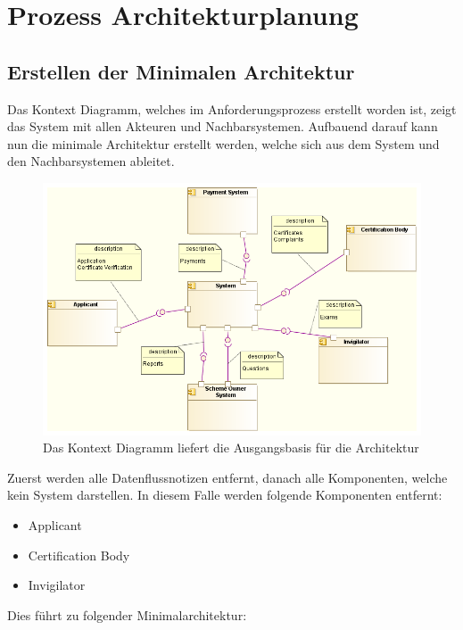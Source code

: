 \chapter{Prozess Architekturplanung}
\section{Erstellen der Minimalen Architektur}
Das Kontext Diagramm, welches im Anforderungsprozess erstellt worden ist, zeigt das System mit allen Akteuren und Nachbarsystemen. Aufbauend darauf kann nun die minimale Architektur erstellt werden, welche sich aus dem System und den Nachbarsystemen ableitet.

\begin{figure}[!htbp]
    \centering
    \includegraphics[scale=0.5]{uml/context.png}
    \caption{Das Kontext Diagramm liefert die Ausgangsbasis für die Architektur}
\end{figure}

Zuerst werden alle Datenflussnotizen entfernt, danach alle Komponenten, welche kein System darstellen. In diesem Falle werden folgende Komponenten entfernt:

\begin{itemize}
  \item Applicant
  \item Certification Body
  \item Invigilator
\end{itemize}

Dies führt zu folgender Minimalarchitektur:

